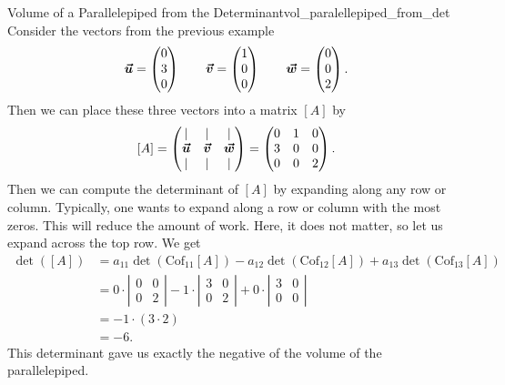 \begin{ex}{Volume of a Parallelepiped from the Determinant}{vol_paralellepiped_from_det}
 Consider the vectors from the previous example
 \[
 \boldsymbol{\boldsymbol{\vec{u}}} = \begin{pmatrix} 0 \\ 3 \\ 0 \end{pmatrix} \qquad \boldsymbol{\boldsymbol{\vec{v}}} = \begin{pmatrix} 1 \\ 0 \\ 0 \end{pmatrix} \qquad \boldsymbol{\boldsymbol{\vec{w}}} = \begin{pmatrix} 0 \\ 0 \\ 2 \end{pmatrix}.
 \]
 Then we can place these three vectors into a matrix $[A]$ by
 \[
 [A]=\begin{pmatrix} \vert & \vert & \vert \\ \boldsymbol{\boldsymbol{\vec{u}}} & \boldsymbol{\boldsymbol{\vec{v}}} & \boldsymbol{\boldsymbol{\vec{w}}} \\ \vert & \vert & \vert \end{pmatrix} = \begin{pmatrix} 0 & 1 & 0 \\ 3 & 0 & 0 \\ 0 & 0 & 2 \end{pmatrix}.
 \]
 Then we can compute the determinant of $[A]$ by expanding along any row or column.  Typically, one wants to expand along a row or column with the most zeros. This will reduce the amount of work.  Here, it does not matter, so let us expand across the top row. We get
 \begin{align*}
 \det([A]) &= a_{11} \det(\textrm{Cof}_{11}[A]) - a_{12} \det(\textrm{Cof}_{12}[A]) + a_{13} \det(\textrm{Cof}_{13}[A])\\
 &=0\cdot \left| \begin{matrix} 0 & 0 \\ 0 & 2 \end{matrix} \right| - 1 \cdot \left| \begin{matrix} 3 & 0 \\ 0 & 2 \end{matrix} \right| + 0 \cdot \left| \begin{matrix} 3 & 0 \\ 0 & 0 \end{matrix} \right|\\
 &= -1 \cdot(3\cdot 2)\\
 &= -6.
 \end{align*}
 This determinant gave us exactly the negative of the volume of the parallelepiped. 
\end{ex}

